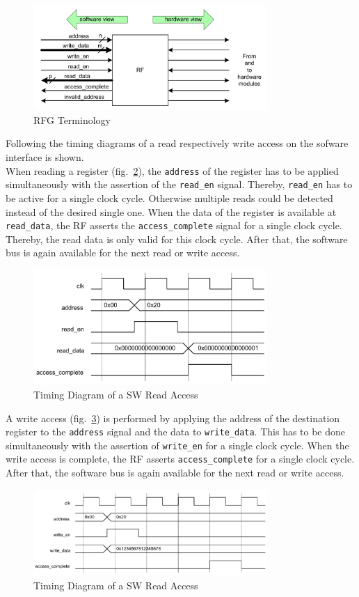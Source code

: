 \begin{figure}[h]
 \centering
 \includegraphics[width=252pt]{images/rf_view.png}
 \caption{RFG Terminology \cite{leber_diss}}
\label{fig::rfg_view}
\end{figure}
Following the timing diagrams of a read respectively write access on the sofware interface is shown.\\
When reading a register (fig.~\ref{fig::sw_read}), the \lstinline$address$ of the register has to be applied simultaneously with the assertion of the \lstinline$read_en$ signal. Thereby, \lstinline$read_en$ has to be active for a single clock cycle. Otherwise multiple reads could be detected instead of the desired single one. When the data of the register is available at \lstinline$read_data$, the RF asserts the \lstinline$access_complete$ signal for a single clock cycle. Thereby, the read data is only valid for this clock cycle. After that, the software bus is again available for the next read or write access.\\
\begin{figure}[h]
 \centering
 \includegraphics[width=252pt]{images/sw_read_timing.png}
 \caption{Timing Diagram of a SW Read Access \cite{leber_diss}}
\label{fig::sw_read}
\end{figure}
A write access (fig.~\ref{fig::sw_write}) is performed by applying the address of the destination register to the \lstinline$address$ signal and the data to \lstinline$write_data$. This has to be done simultaneously with the assertion of \lstinline$write_en$ for a single clock cycle. When the write access is complete, the RF asserts \lstinline$access_complete$ for a single clock cycle. After that, the software bus is again available for the next read or write access.
\begin{figure}[h]
 \centering
 \includegraphics[width=252pt]{images/sw_write_timing.png}
 \caption{Timing Diagram of a SW Read Access \cite{leber_diss}}
\label{fig::sw_write}
\end{figure}

